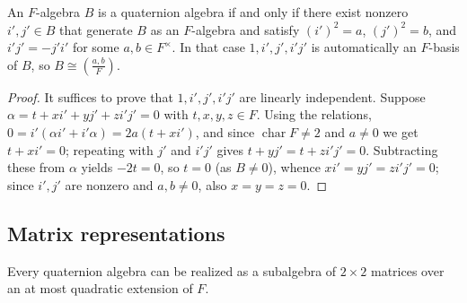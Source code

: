 \begin{lemma}
    \label{lem:standard-generators-presentation}
    \leanok
    An $F$-algebra $B$ is a quaternion algebra if and only if there exist nonzero
    $i', j' \in B$ that generate $B$ as an $F$-algebra and satisfy
    $(i')^2 = a$, $(j')^2 = b$, and $i'j' = -j'i'$ for some $a, b \in F^\times$.
    In that case $1, i', j', i'j'$ is automatically an $F$-basis of $B$, so
    $B \cong \left(\frac{a,b}{F}\right)$.
\end{lemma}
\begin{proof}
    It suffices to prove that $1, i', j', i'j'$ are linearly independent. Suppose
    $\alpha = t + xi' + yj' + zi'j' = 0$ with $t,x,y,z \in F$. Using the relations,
    $0 = i'(\alpha i' + i'\alpha) = 2a(t + xi')$, and since
    $\operatorname{char} F \neq 2$ and $a \neq 0$ we get $t + xi' = 0$; repeating
    with $j'$ and $i'j'$ gives $t + yj' = t + zi'j' = 0$. Subtracting these from
    $\alpha$ yields $-2t = 0$, so $t = 0$ (as $B \neq 0$), whence
    $xi' = yj' = zi'j' = 0$; since $i', j'$ are nonzero and $a, b \neq 0$, also
    $x = y = z = 0$.
\end{proof}

\subsection{Matrix representations}

Every quaternion algebra can be realized as a subalgebra of $2 \times 2$ matrices
over an at most quadratic extension of $F$.

